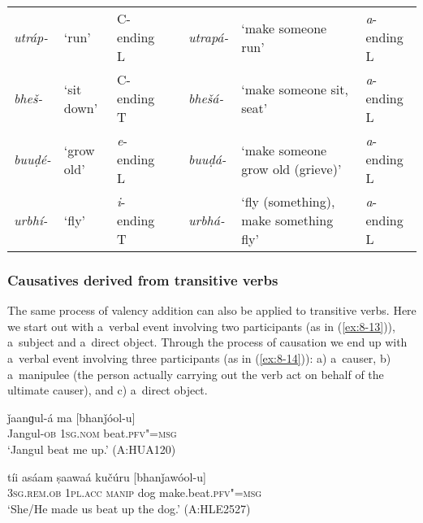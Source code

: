 \begin{table}[H]
\begin{tabularx}{\textwidth}{ l  P{10mm}  l  l  l  Q  l }

\textit{utráp-} &
`run' &
C-ending L &
\centering {\textgreater} &
\textit{utrapá-} &
`make someone run' &
\textit{a}-ending L\\
\textit{bheš-} &
`sit down' &
C-ending T &
\centering {\textgreater} &
\textit{bhešá-} &
`make someone sit, seat' &
\textit{a}-ending L\\
\textit{buuḍé-} &
`grow old' &
\textit{e}-ending L &
\centering {\textgreater}\par
&
\textit{buuḍá-} &
`make someone grow old (grieve)' &
\textit{a}-ending L\\
\textit{urbhí-} &
`fly'
&
{\textit{i}-ending T}
&
\centering {\textgreater}\par
&
\textit{urbhá-}
&
`fly (something), make something fly' &
{\textit{a}-ending L}
\\
\end{tabularx}
\end{table}

\subsubsection*{Causatives derived from transitive verbs}

The same process of valency addition can also be applied to transitive verbs. Here we start out with a~verbal event involving two participants (as in (\ref{ex:8-13})), a~subject and a~direct object. Through the process of causation we end up with a~verbal event involving three participants (as in (\ref{ex:8-14})): a) a~causer, b) a~manipulee (the person actually carrying out the verb act on behalf of the ultimate causer), and c) a~direct object.

\begin{exe}
\ex
\label{ex:8-13}
\gll ǰaanɡul-á ma [bhanǰóol-u] \\
Jangul-\textsc{ob} \textsc{1sg.nom} beat.\textsc{pfv"=msg} \\
\glt `Jangul beat me up.' (A:HUA120)
\end{exe}
\begin{exe}
\ex
\label{ex:8-14}
\gll tíi asáam ṣaawaá kučúru [bhanǰawóol-u] \\
\textsc{3sg.rem.ob} \textsc{1pl.acc} \textsc{manip} dog make.beat.\textsc{pfv"=msg} \\
\glt `She/He made us beat up the dog.' (A:HLE2527)
\end{exe}

